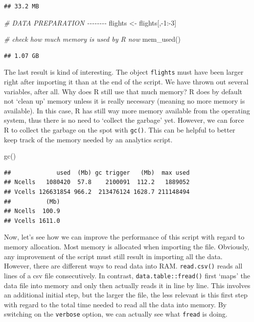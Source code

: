 \documentclass[
  12pt,
]{style/krantz}
\newenvironment{Shaded}{\begin{snugshade}}{\end{snugshade}}
\newcommand{\CommentTok}[1]{\textcolor[rgb]{0.56,0.35,0.01}{\textit{#1}}}
\newcommand{\DecValTok}[1]{\textcolor[rgb]{0.00,0.00,0.81}{#1}}
\newcommand{\FunctionTok}[1]{\textcolor[rgb]{0.00,0.00,0.00}{#1}}
\newcommand{\NormalTok}[1]{#1}
\newcommand{\OtherTok}[1]{\textcolor[rgb]{0.56,0.35,0.01}{#1}}
\newcommand{\SpecialCharTok}[1]{\textcolor[rgb]{0.00,0.00,0.00}{#1}}
\begin{document}
\begin{verbatim}
## 33.2 MB
\end{verbatim}

\begin{Shaded}
\begin{Highlighting}[]
\CommentTok{\# DATA PREPARATION {-}{-}{-}{-}{-}{-}{-}{-}}
\NormalTok{flights }\OtherTok{\textless{}{-}}\NormalTok{ flights[,}\SpecialCharTok{{-}}\DecValTok{1}\SpecialCharTok{:{-}}\DecValTok{3}\NormalTok{]}

\CommentTok{\# check how much memory is used by R now}
\FunctionTok{mem\_used}\NormalTok{()}
\end{Highlighting}
\end{Shaded}

\begin{verbatim}
## 1.07 GB
\end{verbatim}

The last result is kind of interesting. The object \texttt{flights} must have been larger right after importing it than at the end of the script. We have thrown out several variables, after all. Why does R still use that much memory? R does by default not `clean up' memory unless it is really necessary (meaning no more memory is available). In this case, R has still way more memory available from the operating system, thus there is no need to `collect the garbage' yet. However, we can force R to collect the garbage on the spot with \texttt{gc()}. This can be helpful to better keep track of the memory needed by an analytics script.

\begin{Shaded}
\begin{Highlighting}[]
\FunctionTok{gc}\NormalTok{()}
\end{Highlighting}
\end{Shaded}

\begin{verbatim}
##             used  (Mb) gc trigger   (Mb)  max used
## Ncells   1080420  57.8    2100091  112.2   1889052
## Vcells 126631854 966.2  213476124 1628.7 211148494
##          (Mb)
## Ncells  100.9
## Vcells 1611.0
\end{verbatim}

Now, let's see how we can improve the performance of this script with regard to memory allocation. Most memory is allocated when importing the file. Obviously, any improvement of the script must still result in importing all the data. However, there are different ways to read data into RAM. \texttt{read.csv()} reads all lines of a csv file consecutively. In contrast, \texttt{data.table::fread()} first `maps' the data file into memory and only then actually reads it in line by line. This involves an additional initial step, but the larger the file, the less relevant is this first step with regard to the total time needed to read all the data into memory. By switching on the \texttt{verbose} option, we can actually see what \texttt{fread} is doing.
\end{document}

